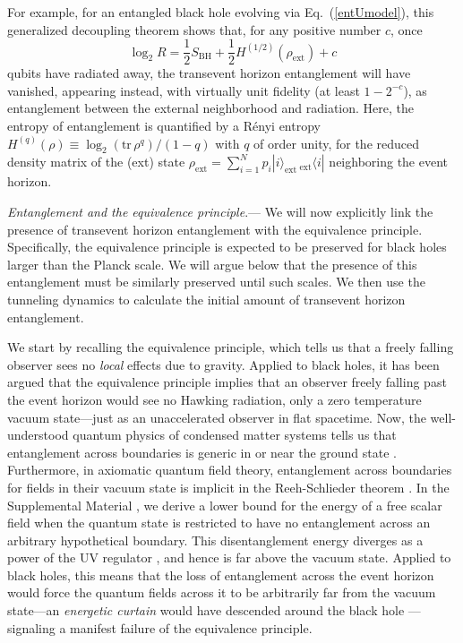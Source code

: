 \documentclass[aps,showpacs,prl,12pt]{revtex4}
\begin{document}
For example, for an entangled black hole evolving via
Eq.~(\ref{entUmodel}), this generalized decoupling theorem shows that,
for any positive number $c$, once
\begin{equation}
\log_2 R=\frac{1}{2}S_{\text{BH}}+\frac{1}{2}H^{(1/2)}(\rho_{\text{ext}})+c
\label{entVanishing}
\end{equation}
qubits have radiated away, the transevent horizon entanglement
will have vanished, appearing instead, with virtually unit fidelity
(at least $1-2^{-c}$), as entanglement between the external neighborhood
and radiation. Here, the entropy of entanglement is quantified by a
R\'enyi entropy
$H^{(q)}(\rho) \equiv \log_2({\text{tr}}\, \rho^q)/(1-q)$ with $q$
of order unity, for the reduced density matrix of the (ext) state
$\rho_{\text{ext}}=\sum_{i=1}^N p_i |i\rangle_{\text{ext}}\,
{}_{\text{ext}} \langle i|$ neighboring the event horizon.

{\it Entanglement and the equivalence principle}.---%
We will now explicitly link the presence of transevent horizon 
entanglement with the equivalence principle. Specifically, the 
equivalence principle is expected to be preserved for black holes 
larger than the Planck scale. We will argue below that the presence
of this entanglement must be similarly preserved until such scales.
We then use the tunneling dynamics to calculate the initial amount
of transevent horizon entanglement.
  
We start by recalling the equivalence principle, 
which tells us that a freely falling observer sees no {\it local\/} 
effects due to gravity. Applied to black holes, it has been
argued \cite{Susskind93} that the equivalence principle implies that
an observer freely falling past the event horizon would see no Hawking
radiation, only a zero temperature vacuum state---just as an
unaccelerated observer in flat spacetime. Now, the well-understood quantum
physics of condensed matter systems tells us that entanglement across
boundaries is generic in or near the ground state \cite{Eisert09}.
Furthermore, in axiomatic quantum field theory, entanglement across
boundaries for fields in their vacuum state is implicit in the
Reeh-Schlieder theorem \cite{Schlieder}. 
In the Supplemental Material \cite{SM}, we derive a lower bound for the
energy of a free scalar field when the quantum state is restricted
to have no entanglement across an arbitrary hypothetical boundary.
This disentanglement energy diverges as a power of the UV regulator
\cite{SM}, and hence is far above the vacuum state. Applied to black
holes, this means that the loss of entanglement across the event horizon
%
would force the quantum fields across it to be arbitrarily far from the
vacuum state---an {\it energetic curtain\/} would have descended around
the black hole \cite{SLB2009}---signaling
%
a manifest failure of the equivalence principle.
\end{document}
